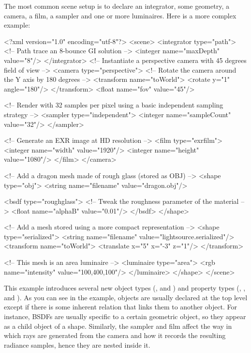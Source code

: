 The most common scene setup is to declare an integrator, some geometry, a camera, a film, a sampler  
and one or more luminaires. Here is a more complex example:
\begin{xml}
<?xml version="1.0" encoding="utf-8"?>
<scene>
	<integrator type="path"> <!-- Path trace an 8-bounce GI solution -->
		<integer name="maxDepth" value="8"/>
	</integrator>
	<!-- Instantiate a perspective camera with 45 degrees field of view -->
	<camera type="perspective">
		<!-- Rotate the camera around the Y axis by 180 degrees -->
		<transform name="toWorld">
			<rotate y="1" angle="180"/>
		</transform>
		<float name="fov" value="45"/>

		<!-- Render with 32 samples per pixel using a basic
             independent sampling strategy -->
		<sampler type="independent">
			<integer name="sampleCount" value="32"/>
		</sampler>

		<!-- Generate an EXR image at HD resolution -->
		<film type="exrfilm">
			<integer name="width" value="1920"/>
			<integer name="height" value="1080"/>
		</film>
	</camera>

	<!-- Add a dragon mesh made of rough glass (stored as OBJ) -->
	<shape type="obj">
		<string name="filename" value="dragon.obj"/>

		<bsdf type="roughglass">
			<!-- Tweak the roughness parameter of the material -->
			<float name="alphaB" value="0.01"/>
		</bsdf>
	</shape>

	<!-- Add a mesh stored using a more compact representation -->
	<shape type="serialized">
		<string name="filename" value="lightsource.serialized"/>
		<transform name="toWorld">
			<translate x="5" x="-3" z="1"/>
		</transform>

		<!-- This mesh is an area luminaire -->
		<luminaire type="area">
			<rgb name="intensity" value="100,400,100"/>
		</luminaire>
	</shape>
</scene>
\end{xml}
\newpage
This example introduces several new object types (, and )
and property types (, , and ). 
As you can see in the example, objects are usually declared at the top level except if there is some
inherent relation that links them to another object. For instance, BSDFs are usually specific to a certain geometric object, so 
they appear as a child object of a shape. Similarly, the sampler and film affect the way in which
rays are generated from the camera and how it records the resulting radiance samples, hence they are nested inside it.

